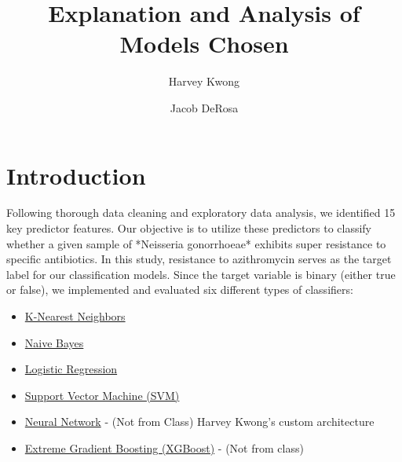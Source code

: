 \documentclass[manuscript,screen,review, nonacm]{acmart}
\begin{document}
\title{Explanation and Analysis of Models Chosen}

\author{Harvey Kwong}
\author{Jacob DeRosa}


\maketitle

\section{Introduction}

Following thorough data cleaning and exploratory data analysis, we identified 15 key predictor features. Our objective is to utilize these predictors to classify whether a given sample of *Neisseria gonorrhoeae* exhibits super resistance to specific antibiotics. In this study, resistance to azithromycin serves as the target label for our classification models. Since the target variable is binary (either true or false), we implemented and evaluated six different types of classifiers:
  
  \begin{itemize}
      \item \href{https://scikit-learn.org/stable/modules/generated/sklearn.neighbors.KNeighborsClassifier.html}{K-Nearest Neighbors}
      \item \href{https://scikit-learn.org/stable/modules/naive_bayes.html}{Naive Bayes}
      \item \href{https://scikit-learn.org/stable/modules/generated/sklearn.linear_model.LogisticRegression.html}{Logistic Regression}
      \item \href{https://scikit-learn.org/stable/modules/svm.html}{Support Vector Machine (SVM)}
      \item \href{https://www.tensorflow.org/api_docs/python/tf/keras/Sequential}{Neural Network} - (Not from Class) Harvey Kwong's custom architecture
      \item \href{https://xgboost.readthedocs.io/en/stable/get_started.html}{Extreme Gradient Boosting (XGBoost)} - (Not from class)
  \end{itemize}
  
\end{document}
